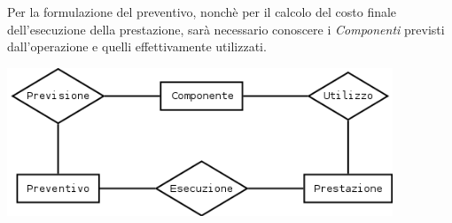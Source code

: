 		Per la formulazione del preventivo, nonchè per il calcolo del costo finale dell'esecuzione della prestazione, sarà necessario conoscere i \emph{Componenti} previsti dall'operazione e quelli effettivamente utilizzati.
		
		\vspace{0.5cm}
		\includegraphics[width=11.5cm]{images/diagrams/componente_preventivo_prestazione.png}
		\vspace{0.3cm}
		
		